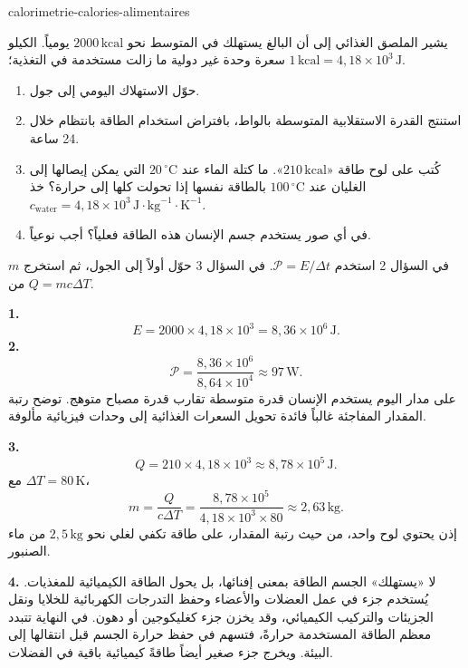 \begin{exo}{calorimetrie-calories-alimentaires}

يشير الملصق الغذائي إلى أن البالغ يستهلك في المتوسط نحو $2000\,\text{kcal}$ يومياً. الكيلو سعرة وحدة غير دولية ما زالت مستخدمة في التغذية؛ $1\,\text{kcal}=4{,}18\times10^3\,\text{J}$.
\begin{enumerate}
  \item حوّل الاستهلاك اليومي إلى جول.
  \item استنتج القدرة الاستقلابية المتوسطة بالواط، بافتراض استخدام الطاقة بانتظام خلال 24 ساعة.
  \item كُتب على لوح طاقة «$210\,\text{kcal}$». ما كتلة الماء عند $20\,^\circ\text{C}$ التي يمكن إيصالها إلى الغليان عند $100\,^\circ\text{C}$ بالطاقة نفسها إذا تحولت كلها إلى حرارة؟ خذ $c_{\text{water}}=4{,}18\times10^3\,\text{J}\!\cdot\!\text{kg}^{-1}\!\cdot\!\text{K}^{-1}$.
  \item في أي صور يستخدم جسم الإنسان هذه الطاقة فعلياً؟ أجب نوعياً.
\end{enumerate}
\begin{indication}
في السؤال 2 استخدم $\mathcal P=E/\Delta t$. في السؤال 3 حوّل أولاً إلى الجول، ثم استخرج $m$ من $Q=mc\Delta T$.
\end{indication}
\begin{solution}
\textbf{1.}
\[
E=2000\times4{,}18\times10^3=8{,}36\times10^6\,\text{J}.
\]
\textbf{2.}
\[
\mathcal P=\frac{8{,}36\times10^6}{8{,}64\times10^4}\approx97\,\text{W}.
\]
على مدار اليوم يستخدم الإنسان قدرة متوسطة تقارب قدرة مصباح متوهج. توضح رتبة المقدار المفاجئة غالباً فائدة تحويل السعرات الغذائية إلى وحدات فيزيائية مألوفة.

\textbf{3.}
\[
Q=210\times4{,}18\times10^3\approx8{,}78\times10^5\,\text{J}.
\]
مع $\Delta T=80\,\text{K}$،
\[
m=\frac{Q}{c\Delta T}
=\frac{8{,}78\times10^5}{4{,}18\times10^3\times80}
\approx2{,}63\,\text{kg}.
\]
إذن يحتوي لوح واحد، من حيث رتبة المقدار، على طاقة تكفي لغلي نحو $2{,}5\,\text{kg}$ من ماء الصنبور.

\textbf{4.} لا «يستهلك» الجسم الطاقة بمعنى إفنائها، بل يحول الطاقة الكيميائية للمغذيات. يُستخدم جزء في عمل العضلات والأعضاء وحفظ التدرجات الكهربائية للخلايا ونقل الجزيئات والتركيب الكيميائي، وقد يخزن جزء كغليكوجين أو دهون. في النهاية تتبدد معظم الطاقة المستخدمة حرارةً، فتسهم في حفظ حرارة الجسم قبل انتقالها إلى البيئة. ويخرج جزء صغير أيضاً طاقةً كيميائية باقية في الفضلات.
\end{solution}
\end{exo}
